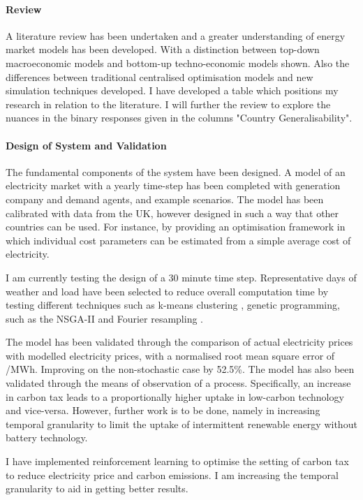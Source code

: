 \documentclass[12pt]{article}
\begin{document}
\paragraph{Review}

A literature review has been undertaken and a greater understanding of energy market models has been developed. With a distinction between top-down macroeconomic models and bottom-up techno-economic models shown. Also the differences between traditional centralised optimisation models and new simulation techniques developed. I have developed a table which positions my research in relation to the literature. I will further the review to explore the nuances in the binary responses given in the columns "Country Generalisability".

\paragraph{Design of System and Validation}

The fundamental components of the system have been designed. A model of an electricity market with a yearly time-step has been completed with generation company and demand agents, and example scenarios. The model has been calibrated with data from the UK, however designed in such a way that other countries can be used. For instance, by providing an optimisation framework in which individual cost parameters can be estimated from a simple average cost of electricity.

I am currently testing the design of a 30 minute time step. Representative days of weather and load have been selected to reduce overall computation time by testing different techniques such as k-means clustering \cite{Forgy65}, genetic programming, such as the NSGA-II \cite{Valkanas2014} and Fourier resampling \cite{Cooley2006}. 

The model has been validated through the comparison of actual electricity prices with modelled electricity prices, with a normalised root mean square error of /MWh. Improving on the non-stochastic case by 52.5\%. The model has also been validated through the means of observation of a process. Specifically, an increase in carbon tax leads to a proportionally higher uptake in low-carbon technology and vice-versa. However, further work is to be done, namely in increasing temporal granularity to limit the uptake of intermittent renewable energy without battery technology.

I have implemented reinforcement learning to optimise the setting of carbon tax to reduce electricity price and carbon emissions. I am increasing the temporal granularity to aid in getting better results.
\end{document}
